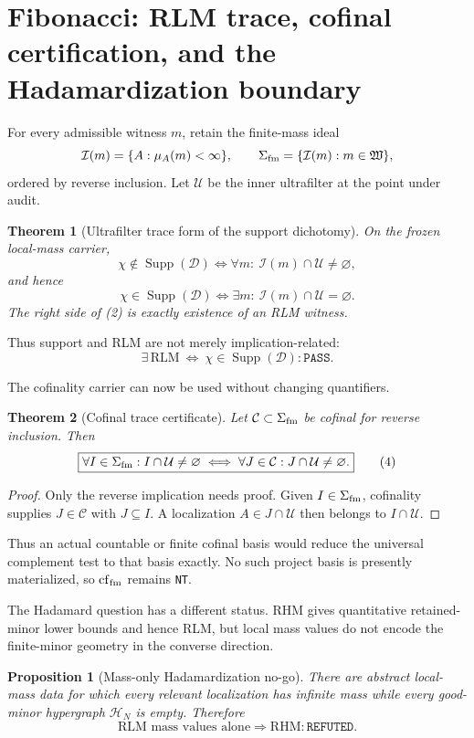 \documentclass[10pt,a4paper]{article}
\newcommand{\PASS}{\texttt{PASS}}
\newcommand{\NT}{\texttt{NT}}
\newcommand{\REF}{\texttt{REFUTED}}
\newcommand{\Supp}{\operatorname{Supp}}
\newcommand{\cfm}{\operatorname{cf}_{\rm fm}}
\newtheorem{theorem}{Theorem}
\newtheorem{proposition}{Proposition}
\begin{document}
\section{Fibonacci: RLM trace, cofinal certification, and the Hadamardization boundary}
For every admissible witness $m$, retain the finite-mass ideal
\[
\mathcal I(m)=\{A:\mu_A(m)<\infty\},
\qquad
\Sigma_{\rm fm}=\{\mathcal I(m):m\in\mathfrak W\},
\]
ordered by reverse inclusion.  Let $\mathcal U$ be the inner ultrafilter at the point under audit.

\begin{theorem}[Ultrafilter trace form of the support dichotomy]
On the frozen local-mass carrier,
\[
\boxed{
\chi\notin\Supp(\mathcal D)
\iff
\forall m:\ \mathcal I(m)\cap\mathcal U\ne\varnothing,
}
\tag{1}
\]
and hence
\[
\boxed{
\chi\in\Supp(\mathcal D)
\iff
\exists m:\ \mathcal I(m)\cap\mathcal U=\varnothing.
}
\tag{2}
\]
The right side of (2) is exactly existence of an RLM witness.
\end{theorem}

Thus support and RLM are not merely implication-related:
\[
\boxed{\exists\,\mathrm{RLM}\ \Longleftrightarrow\ \chi\in\Supp(\mathcal D):\PASS.}
\tag{3}
\]

The cofinality carrier can now be used without changing quantifiers.

\begin{theorem}[Cofinal trace certificate]
Let $\mathcal C\subset\Sigma_{\rm fm}$ be cofinal for reverse inclusion. Then
\[
\boxed{
\forall I\in\Sigma_{\rm fm}: I\cap\mathcal U\ne\varnothing
\iff
\forall J\in\mathcal C: J\cap\mathcal U\ne\varnothing.
}
\tag{4}
\]
\end{theorem}
\begin{proof}
Only the reverse implication needs proof.  Given $I\in\Sigma_{\rm fm}$, cofinality supplies $J\in\mathcal C$ with $J\subseteq I$.  A localization $A\in J\cap\mathcal U$ then belongs to $I\cap\mathcal U$.
\end{proof}

Thus an actual countable or finite cofinal basis would reduce the universal complement test to that basis exactly.  No such project basis is presently materialized, so $\cfm$ remains \NT.

The Hadamard question has a different status.  RHM gives quantitative retained-minor lower bounds and hence RLM, but local mass values do not encode the finite-minor geometry in the converse direction.

\begin{proposition}[Mass-only Hadamardization no-go]
There are abstract local-mass data for which every relevant localization has infinite mass while every good-minor hypergraph $\mathcal H_N$ is empty.  Therefore
\[
\boxed{\text{RLM mass values alone}\Rightarrow\text{RHM}:\REF.}
\tag{5}
\]
\end{proposition}
\end{document}
